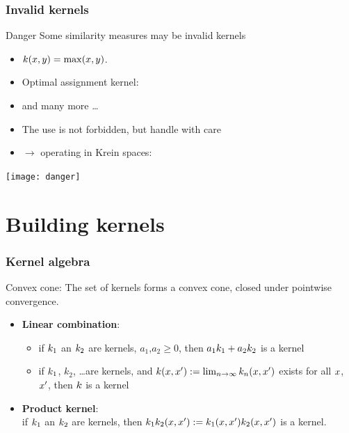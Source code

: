 \documentclass[11pt, pdf, compress, handout]{beamer}
\begin{document}
\begin{frame}
  \frametitle{Invalid kernels}
  \begin{block}{Danger}
    Some similarity measures may be invalid kernels
    \begin{itemize}
    \item ${\mathnormal{k}}(x,y) = \max(x,y)$. 
    \item Optimal assignment kernel:
      \citep{Frohlich05optimalassignment}
    \item and many more \dots
    \item The use is not forbidden, but handle with care
    \item $\to$ operating in Krein spaces: \citep{Loosli13svmin}
    \end{itemize}
  \end{block}
    \begin{center}
    \texttt{[image: danger]}
  \end{center}

\end{frame}
\section{Building kernels}
\begin{frame}
\frametitle{Kernel algebra}


\begin{block}{Convex cone:}
  The set of kernels forms a convex cone, closed under pointwise
  convergence.


  \vspace{.5cm}
  \begin{itemize}
  \item \textbf{Linear combination}:
    \begin{itemize}
    \item if ${\mathnormal{k}}_1$ an ${\mathnormal{k}}_2$ are kernels, $a_1$,$a_2 \geq 0$, then
      $a_1{\mathnormal{k}}_1 + a_2 {\mathnormal{k}}_2$ is a kernel
    \item if ${\mathnormal{k}}_1$, $k_2$, \dots are kernels, and
      ${\mathnormal{k}}({\mathnormal{x}},{\mathnormal{x}}') := \lim_{n\to\infty} {\mathnormal{k}}_n({\mathnormal{x}},{\mathnormal{x}}')$
      exists for all ${\mathnormal{x}}$, ${\mathnormal{x}}'$, then ${\mathnormal{k}}$ is a kernel
    \end{itemize}
      \vspace{.5cm}
  \item \textbf{Product kernel}: \\
    if  ${\mathnormal{k}}_1$ an ${\mathnormal{k}}_2$ are kernels, then ${\mathnormal{k}}_1{\mathnormal{k}}_2({\mathnormal{x}},{\mathnormal{x}}')
    := {\mathnormal{k}}_1({\mathnormal{x}},{\mathnormal{x}}'){\mathnormal{k}}_2({\mathnormal{x}},{\mathnormal{x}}')$ is a kernel.  

  \end{itemize}
\end{block}
\end{frame} 
\end{document}
